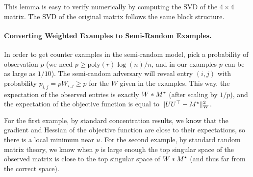 This lemma is easy to verify numerically by computing the SVD of the $ 4\times 4$ matrix. The SVD of the original matrix follows the same block structure.

\paragraph{Converting Weighted Examples to Semi-Random Examples.}
In order to get counter examples in the semi-random model, pick a probability of observation $p$ (we need $p \ge \mbox{poly}(r) \log(n) /n$, and in our examples $p$ can be as large as $1/10$).
The semi-random adversary will reveal entry $(i,j)$ with probability $p_{i,j} = p W_{i,j} \ge p$ for the $W$ given in the examples.
This way, the expectation of the observed entries is exactly $W * M^\star$ (after scaling by $1/p$), and the expectation of the objective function is equal to $\|UU^\top - M^\star\|_W^2$.

For the first example, by standard concentration results, we know that the gradient and Hessian of the objective function are close to their expectations, so there is a local minimum near $u$.
For the second example, by standard random matrix theory, we know when $p$ is large enough the top singular space of the observed matrix is close to the top singular space of $W*M^\star$ (and thus far from the correct space).


